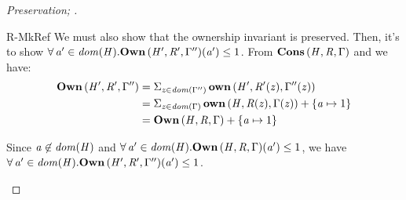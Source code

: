 \begin{proof}[Preservation; ]
\begin{rneqncase}{R-MkRef}
    We must also show that the ownership invariant is preserved.
    Then, it's to show $\forall \,  \mathit{a'}  \in \mathit{dom}( \mathit{H} )   .  \mathbf{Own} \, (  \mathit{H'}  ,  \mathit{R'}  ,  \Gamma''  )  (  \mathit{a'}  )  \le  1$. From $\mathbf{Cons} \, (  \mathit{H}  ,  \mathit{R}  ,  \Gamma  )$ and  we have:
    \begin{align*}
      \mathbf{Own} \, (  \mathit{H'}  ,  \mathit{R'}  ,  \Gamma''  ) & =  \Sigma _{ \mathit{z} \in  \mathit{dom}( \Gamma'' )  }\, \mathbf{own} \, (  \mathit{H'}  ,  \mathit{R'}  (  \mathit{z}  )  ,  \Gamma''  (  \mathit{z}  )  )  \\
             & =  \Sigma _{ \mathit{z} \in  \mathit{dom}( \Gamma )  }\, \mathbf{own} \, (  \mathit{H}  ,  \mathit{R}  (  \mathit{z}  )  ,  \Gamma  (  \mathit{z}  )  )   +  \{  \mathit{a}  \mapsto  1  \} \\
             & = \mathbf{Own} \, (  \mathit{H}  ,  \mathit{R}  ,  \Gamma  )  +  \{  \mathit{a}  \mapsto  1  \}
    \end{align*}

    Since $ \mathit{a}  \not\in \mathit{dom}( \mathit{H} ) $ and $\forall \,  \mathit{a'}  \in \mathit{dom}( \mathit{H} )   .  \mathbf{Own} \, (  \mathit{H}  ,  \mathit{R}  ,  \Gamma  )  (  \mathit{a'}  )  \le  1$,
    we have $\forall \,  \mathit{a'}  \in \mathit{dom}( \mathit{H} )   .  \mathbf{Own} \, (  \mathit{H'}  ,  \mathit{R'}  ,  \Gamma''  )  (  \mathit{a'}  )  \le  1$.


\end{rneqncase}
\end{proof}

